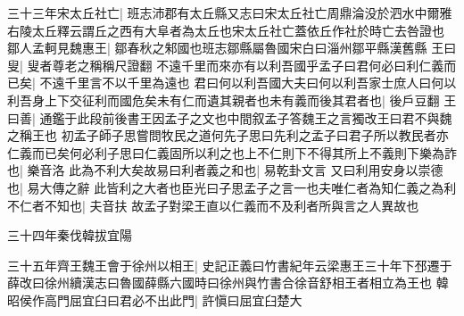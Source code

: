 三十三年宋太丘社亡|{
	班志沛郡有太丘縣又志曰宋太丘社亡周鼎淪没於泗水中爾雅右陵太丘釋云謂丘之西有大阜者為太丘也宋太丘社亡蓋依丘作社於時亡去咎證也}
鄒人孟軻見魏惠王|{
	鄒春秋之邾國也班志鄒縣屬魯國宋白曰淄州鄒平縣漢舊縣}
王曰叟|{
	叟者尊老之稱稱尺證翻}
不遠千里而來亦有以利吾國乎孟子曰君何必曰利仁義而已矣|{
	不遠千里言不以千里為遠也}
君曰何以利吾國大夫曰何以利吾家士庶人曰何以利吾身上下交征利而國危矣未有仁而遺其親者也未有義而後其君者也|{
	後戶豆翻}
王曰善|{
	通鑑于此段前後書王因孟子之文也中間叙孟子答魏王之言獨改王曰君不與魏之稱王也}
初孟子師子思嘗問牧民之道何先子思曰先利之孟子曰君子所以教民者亦仁義而已矣何必利子思曰仁義固所以利之也上不仁則下不得其所上不義則下樂為詐也|{
	樂音洛}
此為不利大矣故易曰利者義之和也|{
	易乾卦文言}
又曰利用安身以崇德也|{
	易大傳之辭}
此皆利之大者也臣光曰子思孟子之言一也夫唯仁者為知仁義之為利不仁者不知也|{
	夫音扶}
故孟子對梁王直以仁義而不及利者所與言之人異故也

三十四年秦伐韓拔宜陽

三十五年齊王魏王會于徐州以相王|{
	史記正義曰竹書紀年云梁惠王三十年下邳遷于薛改曰徐州續漢志曰魯國薛縣六國時曰徐州與竹書合徐音舒相王者相立為王也}
韓昭侯作高門屈宜臼曰君必不出此門|{
	許愼曰屈宜臼楚大}



